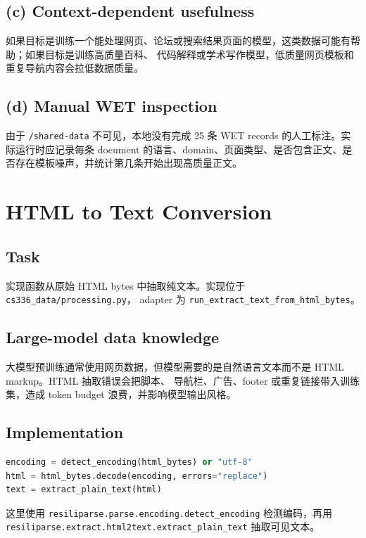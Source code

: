 \documentclass[UTF8,11pt]{ctexart}
\begin{document}
\subsection*{(c) Context-dependent usefulness}

如果目标是训练一个能处理网页、论坛或搜索结果页面的模型，这类数据可能有帮助；如果目标是训练高质量百科、
代码解释或学术写作模型，低质量网页模板和重复导航内容会拉低数据质量。

\subsection*{(d) Manual WET inspection}

由于 \texttt{/shared-data} 不可见，本地没有完成 25 条 WET records 的人工标注。实际运行时应记录每条
document 的语言、domain、页面类型、是否包含正文、是否存在模板噪声，并统计第几条开始出现高质量正文。

\section{HTML to Text Conversion}

\subsection*{Task}

实现函数从原始 HTML bytes 中抽取纯文本。实现位于 \texttt{cs336\_data/processing.py}，
adapter 为 \texttt{run\_extract\_text\_from\_html\_bytes}。

\subsection*{Large-model data knowledge}

大模型预训练通常使用网页数据，但模型需要的是自然语言文本而不是 HTML markup。HTML 抽取错误会把脚本、
导航栏、广告、footer 或重复链接带入训练集，造成 token budget 浪费，并影响模型输出风格。

\subsection*{Implementation}

\begin{lstlisting}[language=Python]
encoding = detect_encoding(html_bytes) or "utf-8"
html = html_bytes.decode(encoding, errors="replace")
text = extract_plain_text(html)
\end{lstlisting}

这里使用 \texttt{resiliparse.parse.encoding.detect\_encoding} 检测编码，再用
\texttt{resiliparse.extract.html2text.extract\_plain\_text} 抽取可见文本。
\end{document}

